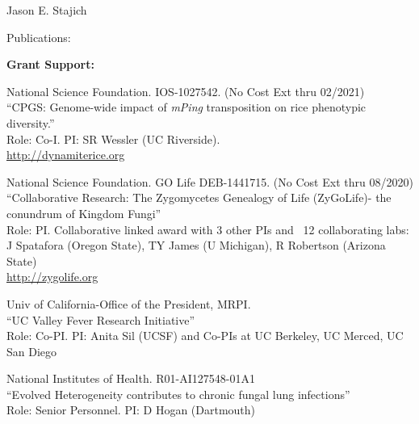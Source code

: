 \documentclass[10pt]{article}
\begin{document}
\begin{cv}{\centerline{Jason E. Stajich}}
\begin{cvlist}{Publications:}
\end{cvlist}
\setlength{\cvlabelwidth}{24mm}


\begin{cvlistcompact}{\bf Grant Support:}
\item [{\bf Ongoing support}]

\item [2011-2017] National Science Foundation. IOS-1027542.  (No Cost Ext thru 02/2021) \\
  ``CPGS: Genome-wide impact of \textit{mPing} transposition on rice phenotypic diversity.'' \\
Role: Co-I. PI: SR Wessler (UC Riverside). \\
\url{http://dynamiterice.org}

\item [2015-2018] National Science Foundation. GO Life DEB-1441715. (No Cost Ext thru 08/2020) \\
``Collaborative Research: The Zygomycetes Genealogy of Life
  (ZyGoLife)- the conundrum of Kingdom Fungi'' \\
  Role: PI. Collaborative linked award with 3 other PIs and ~12
  collaborating labs: J Spatafora (Oregon State), TY James (U
  Michigan), R Robertson (Arizona State) \\
\url{http://zygolife.org}

\item [2017-2020] Univ of California-Office of the President, MRPI. \\
``UC Valley Fever Research Initiative'' \\
Role: Co-PI.  PI: Anita Sil (UCSF) and Co-PIs at UC Berkeley, UC Merced,
UC San Diego

\item [2017-2021] National Institutes of Health. R01-AI127548-01A1 \\
``Evolved Heterogeneity contributes to chronic fungal lung infections'' \\
Role: Senior Personnel. PI: D Hogan (Dartmouth)


\end{cvlistcompact}
\end{cv}
\end{document}
